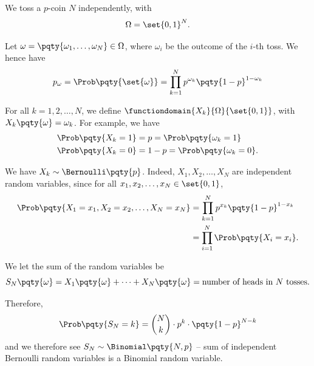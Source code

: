 \begin{example}
    \label{ex:independence-bernoulli}
    We toss a \(p\)-coin \(N\) independently, with
    \[
        \Omega = \set{0, 1}^N.
    \]

    Let \(\omega = \pqty{\omega_1, \ldots, \omega_N} \in \Omega\), where \(\omega_i\) be the outcome of the \(i\)-th toss. We hence have
    \[
        p_\omega = \Prob\pqty{\set{\omega}} = \prod_{k = 1}^{N} p^{\omega_k} \pqty{1 - p}^{1 - \omega_k}
    \]

    For all \(k = 1, 2, \ldots, N\), we define \(\functiondomain{X_k}{\Omega}{\set{0, 1}}\), with \(X_k\pqty{\omega} = \omega_k\). For example, we have
    \begin{align*}
        \Prob\pqty{X_k = 1} &= p = \Prob\pqty{\omega_k = 1} \\
        \Prob\pqty{X_k = 0} &= 1 - p = \Prob\pqty{\omega_k = 0}.
    \end{align*}

    We have \(X_k \sim \Bernoulli\pqty{p}\). Indeed, \(X_1, X_2, \ldots, X_N\) are independent random variables, since for all \(x_1, x_2, \ldots, x_N \in \set{0, 1}\),
    \begin{align*}
        \Prob\pqty{X_1 = x_1, X_2 = x_2, \ldots, X_N = x_N} &= \prod_{k = 1}^{N} p^{x_k} \pqty{1 - p}^{1 - x_k} \\
        &= \prod_{i = 1}^{N} \Prob\pqty{X_i = x_i}.
    \end{align*}

    We let the sum of the random variables be
    \[
        S_N\pqty{\omega} = X_1 \pqty{\omega} + \cdots + X_N \pqty{\omega} = \text{number of heads in }N\text{ tosses}.
    \]

    Therefore,
    \[
        \Prob\pqty{S_N = k} = \binom{N}{k} \cdot p^k \cdot \pqty{1 - p}^{N - k}
    \]
    and we therefore see \(S_N \sim \Binomial\pqty{N, p}\) -- sum of independent Bernoulli random variables is a Binomial random variable.
\end{example}